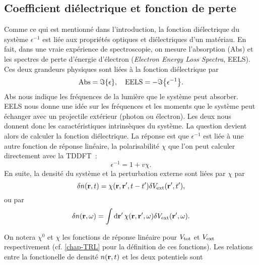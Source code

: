 \subsection{Coefficient diélectrique et fonction de perte}
\label{subsec-eels}
Comme ce qui est mentionné dans l'introduction,
la fonction diélectrique du système $\epsilon^{-1}$ est liée aux propriétés optiques et diélectriques d'un matériau.
En fait, dans une vraie expérience de spectroscopie,
on mesure l'absorption (Abs) et les spectres de perte d'énergie d'électron
(\textit{Electron Energy Loss Spectra}, EELS).
Ces deux grandeurs physiques sont liées à la fonction diélectrique par~\cite{Sottile2003}
\begin{equation}
  \label{eqn-EELS}
  \textnormal{Abs} = \imaginary\qty{\epsilon},
  \quad
  \textnormal{EELS} = -\imaginary\qty{\epsilon^{-1}}.
\end{equation}
Abs nous indique les fréquences de la lumière que le système peut absorber.
EELS nous donne une idée sur les fréquences et les moments
que le système peut échanger avec un projectile extérieur (photon ou électron).
Les deux nous donnent donc les caractéristiques intrinsèques du système.
La question devient alors de calculer la fonction diélectrique. La réponse est que
$\epsilon^{-1}$ est liée à une autre fonction de réponse linéaire,
la polarisabilité $\chi$ que l'on peut calculer directement
avec la TDDFT~\cite{Martin2004, Sottile2003}:
\begin{equation}
  \label{epsilon}
  \epsilon^{-1} = 1+ v\chi.
\end{equation}
En suite, la densité du système et la perturbation externe sont liées par $\chi$ par
\begin{equation}
  \delta n(\vb{r}, t) = \chi(\vb{r}, \vb{r}', t-t')\delta V_{\textnormal{ext}}(\vb{r}', t'),
\end{equation}
ou par
\begin{equation}
  \delta n(\vb{r}, \omega) = \int\dd{\vb{r}'}\chi(\vb{r}, \vb{r}', \omega)\delta V_{\textnormal{ext}}(\vb{r}', \omega).
\end{equation}

On notera $\chi^0$ et $\chi$ les fonctions de réponse linéaire pour
$V_{\textnormal{tot}}$ et $V_{\textnormal{ext}}$ respectivement (cf. \cref{chap-TRL} pour la définition de ces fonctions).
Les relations entre la fonctionelle de densité $n(\vb{r}, t)$ et les deux potentiels sont

